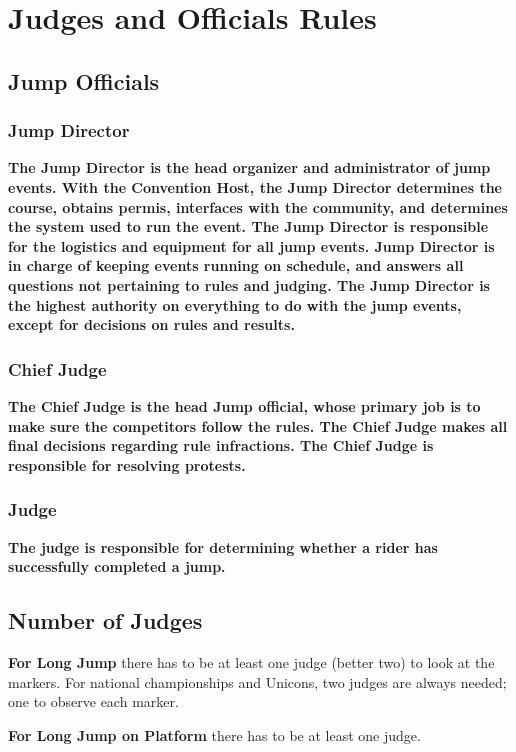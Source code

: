 \chapter{Judges and Officials Rules}

\section{Jump Officials}

\subsection{Jump Director}

\textbf{The Jump Director is the head organizer and administrator of jump
events.  With the Convention Host, the Jump Director determines the course,
obtains permis, interfaces with the community, and determines the system
used to run the event.  The Jump Director is responsible for the logistics and
equipment for all jump events.  
Jump Director is in charge of keeping events running on schedule, and
answers all questions not pertaining to rules and judging.  The Jump
Director is the highest authority on everything to do with the jump
events, except for decisions on rules and results.}

\subsection{Chief Judge}

\textbf{The Chief Judge is the head Jump official, whose primary job is to make sure
the competitors follow the rules.  The Chief Judge makes all final decisions
regarding rule infractions. The Chief Judge is responsible for resolving
protests.}

\subsection{Judge}

\textbf{The judge is responsible for determining whether a rider has successfully completed a jump.}

\section{Number of Judges}

\textbf{For Long Jump} there has to be at least one judge (better two) to look at the markers.
For national championships and Unicons, two judges are always needed; one to observe each marker.

\textbf{For Long Jump on Platform} there has to be at least one judge.
